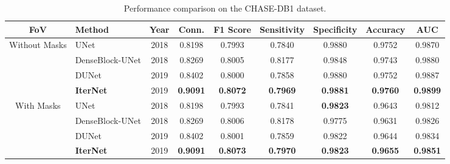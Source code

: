 \documentclass[10pt,twocolumn,letterpaper]{article}
\begin{document}
\begin{table*}[!t]
	\caption{Performance comparison on the CHASE-DB1 dataset.}
	\label{table_detect_performance_chase}
	\centering
	\begin{tabular}{cl|c|cccccc}
		\hline
		FoV &Method & Year & Conn. & F1 Score & Sensitivity & Specificity & Accuracy & AUC\\ 
		\hline		
	
		\multirow{4}{*}{Without Masks} & UNet & 2018& 0.8198 &0.7993&   0.7840& 0.9880 & 0.9752 & 0.9870\\		
		&DenseBlock-UNet& 2018 & 0.8269 & 0.8005 &0.8177& 0.9848&  0.9743&0.9880\\
		&DUNet &2019& 0.8402 &0.8000&  0.7858 & 0.9880 &  0.9752& 0.9887\\
		&\textbf{IterNet} & 2019& \textbf{0.9091} &  \textbf{0.8072} &  \textbf{0.7969} & \textbf{0.9881} & \textbf{0.9760}& \textbf{0.9899}\\
		
		\hline
		
		\multirow{4}{*}{With Masks}&UNet & 2018& 0.8198 &0.7993&   0.7841& \textbf{0.9823} & 0.9643 & 0.9812\\
		&DenseBlock-UNet& 2018& 0.8269 & 0.8006 &0.8178&0.9775 &  0.9631&0.9826\\
		&DUNet &2019& 0.8402 &0.8001 &  0.7859 & 0.9822 &  0.9644& 0.9834\\
		&\textbf{IterNet} & 2019& \textbf{0.9091} &  \textbf{0.8073} &  \textbf{0.7970} & \textbf{0.9823} & \textbf{0.9655}& \textbf{0.9851}\\
		
		\hline
	\end{tabular}
\end{table*}
\end{document}
